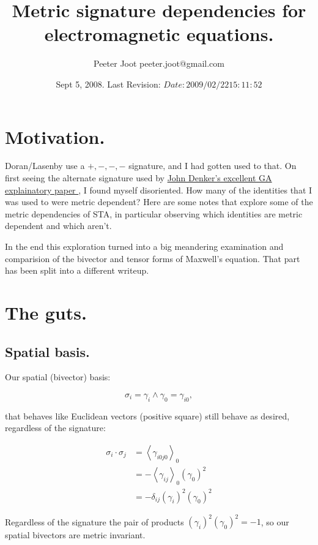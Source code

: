 \documentclass{article}
\title{ Metric signature dependencies for electromagnetic equations. }
\author{Peeter Joot \quad peeter.joot@gmail.com}
\date{ Sept 5, 2008.  Last Revision: $Date: 2009/02/22 15:11:52 $ }
\newcommand{\gpgrade}[2] {{\left\langle{{#1}}\right\rangle}_{#2}}
\newcommand{\gpgradezero}[1] {\gpgrade{#1}{0}}
\begin{document}
\maketitle{}

\tableofcontents

\section{ Motivation. }

Doran/Lasenby use a $+,-,-,-$ signature, and I had gotten used to that.  On first seeing the alternate signature used by 
\href{http://www.av8n.com/physics/maxwell-ga.pdf}{ John Denker's excellent GA explainatory paper }, 
I found myself disoriented.  How many of the identities that I was used to were metric dependent?   Here are some notes that explore some of the
metric dependencies of STA, in particular observing which identities are metric dependent and which aren't.

In the end this exploration turned into a big meandering examination and comparision of the bivector and tensor forms of Maxwell's equation.  That part has been split into a different writeup.

\section{ The guts. }

\subsection{ Spatial basis. }

Our spatial (bivector) basis:

\begin{equation*}
\sigma_i = \gamma_i \wedge \gamma_0 = \gamma_{i0},
\end{equation*}

that behaves like Euclidean vectors (positive square) still behave as desired, regardless of the signature:

\begin{align*}
\sigma_i \cdot \sigma_j
&= \gpgradezero{\gamma_{i0j0}}  \\
&= - \gpgradezero{\gamma_{ij}} (\gamma_{0})^2  \\
&= -\delta_{ij} (\gamma_i)^2 (\gamma_{0})^2
\end{align*}

Regardless of the signature the pair of products $(\gamma_i)^2 (\gamma_{0})^2 = -1$, so our spatial bivectors are metric invariant.
\end{document}
